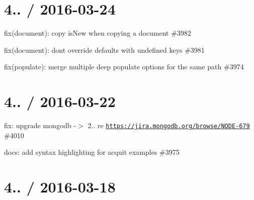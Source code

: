 \section*{4.. / 2016-\/03-\/24 }


\begin{DoxyItemize}
\item fix(document)\+: copy is\+New when copying a document \#3982
\item fix(document)\+: don\textquotesingle{}t override defaults with undefined keys \#3981
\item fix(populate)\+: merge multiple deep populate options for the same path \#3974
\end{DoxyItemize}

\section*{4.. / 2016-\/03-\/22 }


\begin{DoxyItemize}
\item fix\+: upgrade mongodb -\/$>$ 2.. re \href{https://jira.mongodb.org/browse/NODE-679}{\tt https\+://jira.\+mongodb.\+org/browse/\+N\+O\+D\+E-\/679} \#4010
\item docs\+: add syntax highlighting for acquit examples \#3975
\end{DoxyItemize}

\section*{4.. / 2016-\/03-\/18 }


